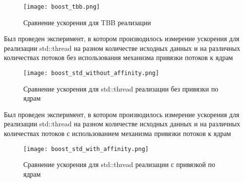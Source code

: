 \documentclass{report}
\begin{document}
\begin{figure}[H]
    \centering
    \texttt{[image: boost\_tbb.png]}
    \caption{Сравнение ускорения для TBB реализации}
    \label{fig:my_label_4}
\end{figure}
\par Был проведен эксперимент, в котором производилось измерение ускорения для реализации std::thread на разном количестве исходных данных и на различных количествах потоков без использования механизма привязки потоков к ядрам
\begin{figure}[H]
    \centering
    \texttt{[image: boost\_std\_without\_affinity.png]}
    \caption{Сравнение ускорения для std::thread реализации без привязки по ядрам}
    \label{fig:my_label_5}
\end{figure}
\par Был проведен эксперимент, в котором производилось измерение ускорения для реализации std::thread на разном количестве исходных данных и на различных количествах потоков с использованием механизма привязки потоков к ядрам
\begin{figure}[H]
    \centering
    \texttt{[image: boost\_std\_with\_affinity.png]}
    \caption{Сравнение ускорения для std::thread реализации с привязкой по ядрам}
    \label{fig:my_label_6}
\end{figure}

\newpage

\end{document}
